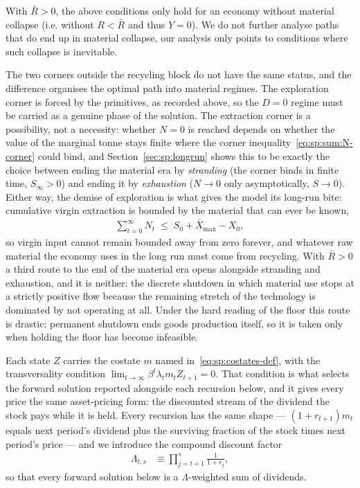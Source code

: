  With $\bar{R}>0$, the above conditions only hold for an economy without material collapse (i.e. without $R<\bar{R}$ and thus $Y= 0$). We do not further analyse paths that do end up in material collapse, our analysis only points to conditions where such collapse is inevitable.


 The two corners outside the recycling block do not have the same
status, and the difference organises the optimal path into material regimes. The exploration corner
is forced by the primitives, as recorded above, so the $D=0$ regime must be carried as a genuine
phase of the solution. The extraction corner is a possibility, not a necessity: whether $N=0$ is
reached depends on whether the value of the marginal tonne stays finite where the corner
inequality~\eqref{eq:sp:sum:N-corner} could bind, and Section~\ref{sec:sp:longrun} shows this to be
exactly the choice between ending the material era by \emph{stranding} (the corner binds in finite
time, $S_\infty>0$) and ending it by \emph{exhaustion} ($N\to0$ only asymptotically, $S\to0$).
Either way, the demise of exploration is what gives the model its long-run bite: cumulative virgin
extraction is bounded by the material that can ever be known,
\begin{align}
\sum_{t=0}^{\infty} N_t \;\le\; S_0+\bar X_{\max}-X_0,
\label{eq:sp:sum:cumulative-N}
\end{align}
so virgin input cannot remain bounded away from zero forever, and whatever raw material the economy
uses in the long run must come from recycling. With $\bar R>0$ a third route to the end of the material era opens alongside stranding and exhaustion, and it is neither: the discrete shutdown in which material use stops at a strictly positive flow because the remaining stretch of the technology is dominated by not operating at all. Under the hard reading of the floor this route is drastic: permanent shutdown ends goods production itself, so it is taken
only when holding the floor has become infeasible.



 Each state $Z$ carries the costate $m$ named in~\eqref{eq:sp:costates-def}, with the transversality condition $\lim_{t\to\infty}\beta^t\lambda_t m_t Z_{t+1}=0$. That condition is what selects the forward solution reported alongside each recursion below, and it gives every price the same asset-pricing form: the discounted stream of the dividend the stock pays while it is held. Every recursion has the same shape --- $\left(1+r_{t+1}\right)m_t$ equals next period's dividend plus the surviving fraction of the stock times next period's price --- and we introduce the compound discount factor
\begin{align}
\Lambda_{t,s} &\equiv \prod_{j=t+1}^{s}\frac{1}{1+r_j},
\label{eq:sp:sum:discount}
\end{align}
so that every forward solution below is a $\Lambda$-weighted sum of dividends.

